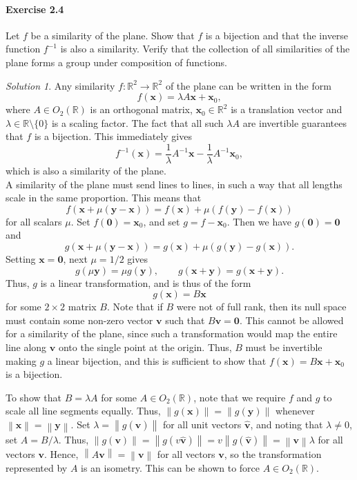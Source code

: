 \documentclass[11pt]{report}
\def\R{\mathbb{R}}
\renewcommand\vec\boldsymbol
\def\vx{\vec{x}}
\def\vy{\vec{y}}
\newcommand\norm[1]{\left\lVert#1\right\rVert}
\theoremstyle{remark}
\newtheorem*{solution}{Solution}
\begin{document}
    \paragraph{Exercise 2.4} Let $f$ be a similarity of the plane. Show that $f$ is a
    bijection and that the inverse function $f^{-1}$ is also a similarity. Verify
    that the collection of all similarities of the plane forms a group under
    composition of functions.
    \begin{solution}
        Any similarity $f\colon \R^2 \to \R^2$ of the plane can be written in the
        form \[
            f(\vx) = \lambda A\vx + \vx_0,
        \] where $A \in O_2(\R)$ is an orthogonal matrix, $\vx_0 \in \R^2$ is a
        translation vector and $\lambda \in \R\setminus\{0\}$ is a scaling factor.
        The fact that all such $\lambda A$ are invertible guarantees that $f$ is a
        bijection. This immediately gives \[
            f^{-1}(\vx) = \frac{1}{\lambda}A^{-1}\vx - \frac{1}{\lambda}A^{-1}\vx_0,
        \] which is also a similarity of the plane. \\

        A similarity of the plane must send lines to lines, in such a way that
        all lengths scale in the same proportion. This means that \[
            f(\vx + \mu(\vy - \vx)) = f(\vx) + \mu (f(\vy) - f(\vx))
        \] for all scalars $\mu$. Set $f(\vec{0}) = \vx_0$, and set $g = f - \vx_0$.
        Then we have $g(\vec{0}) = \vec{0}$ and \[
            g(\vx + \mu(\vy - \vx)) = g(\vx) + \mu(g(\vy) - g(\vx)).
        \] Setting $\vx = \vec{0}$, next $\mu = 1 / 2$ gives \[
            g(\mu\vy) = \mu g(\vy), \qquad g(\vx + \vy) = g(\vx + \vy).
        \] Thus, $g$ is a linear transformation, and is thus of the form \[
            g(\vx) = B\vx
        \] for some $2\times 2$ matrix $B$. Note that if $B$ were not of full rank,
        then its null space must contain some non-zero vector $\vec{v}$ such that
        $B\vec{v} = \vec{0}$. This cannot be allowed for a similarity of the plane,
        since such a transformation would map the entire line along $\vec{v}$ onto
        the single point at the origin. Thus, $B$ must be invertible making $g$ a
        linear bijection, and this is sufficient to show that $f(\vx) = B\vx +
        \vx_0$ is a bijection.

        To show that $B = \lambda A$ for some $A \in O_2(\R)$, note that we require
        $f$ and $g$ to scale all line segments equally. Thus, $\norm{g(\vx)} =
        \norm{g(\vy)}$ whenever $\norm{\vx} = \norm{\vy}$. Set $\lambda =
        \norm{g(\hat{\vec{v}})}$ for all unit vectors $\hat{\vec{v}}$, and noting
        that $\lambda \neq 0$, set $A = B / \lambda$. Thus, $\norm{g(\vec{v})} =
        \norm{g(v\hat{\vec{v}})} = v \norm{g(\hat{\vec{v}})} =
        \norm{\vec{v}}\lambda$ for all vectors $\vec{v}$. Hence, $\norm{A\vec{v}} =
        \norm{\vec{v}}$ for all vectors $\vec{v}$, so the transformation represented
        by $A$ is an isometry. This can be shown to force $A \in O_2(\R)$.
    \end{solution}
\end{document}
